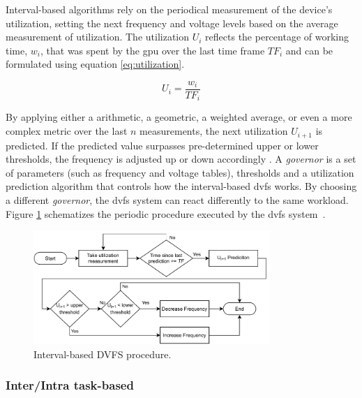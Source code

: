 Interval-based algorithms rely on the periodical measurement of the device's utilization, setting the next frequency and voltage levels based on the average measurement of utilization. The utilization $U_{i}$ reflects the percentage of working time, $w_{i}$, that was spent by the \acrshort{gpu} over the last time frame $TF_{i}$ and can be formulated using equation \ref{eq:utilization}.

\begin{equation}
    U_i=\frac{w_i}{TF_i}
    \label{eq:utilization}
\end{equation}

By applying either a arithmetic, a geometric, a weighted average, or even a more complex metric over the last $n$  measurements,  the next utilization $U_{i+1}$ is predicted. If the predicted value surpasses pre-determined upper or lower thresholds, the frequency is adjusted up or down accordingly \cite{seongki_gpgpu-perf:_2015}. 
A \textit{governor} is a set of parameters (such as frequency and voltage tables), thresholds and a utilization prediction algorithm that controls how the interval-based \acrshort{dvfs} works. By choosing a different \textit{governor}, the \acrshort{dvfs} system can react differently to the same workload. Figure \ref{fig:DVFSprocedure} schematizes the periodic procedure executed by the \acrshort{dvfs} system~\cite{seongki_gpgpu-perf:_2015}. 

\begin{figure}[htb]
  \centering
  \includegraphics[width=0.8\textwidth]{Figures/Background/DVFSprogram.pdf}
  \caption{Interval-based DVFS procedure.}
  \label{fig:DVFSprocedure}
\end{figure}

\subsubsection{Inter/Intra task-based}

